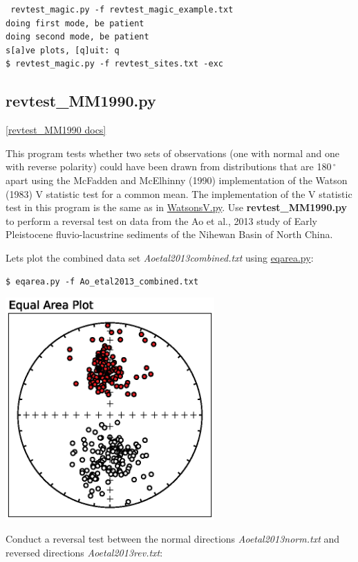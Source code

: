 \documentclass[11pt]{book}
\begin{document}
{{\begin{verbatim}
 revtest_magic.py -f revtest_magic_example.txt
doing first mode, be patient
doing second mode, be patient
s[a]ve plots, [q]uit: q
$ revtest_magic.py -f revtest_sites.txt -exc
\end{verbatim}

\subsection{revtest\_MM1990.py}
\href{https://github.com/PmagPy/PmagPy/blob/master/programs/revtest_MM1990.py}{[revtest\_MM1990 docs]}

This program tests whether two sets of observations (one with normal and one with reverse polarity) could have been drawn from distributions that are 180$\,^{\circ}$ apart using the McFadden and McElhinny (1990) implementation of the Watson (1983) V statistic test for a common mean. The implementation of the V statistic test in this program is the same as in \href{#WatsonsV.py}{WatsonsV.py}. Use \textbf{revtest\_MM1990.py} to perform a reversal test on data from the Ao et al., 2013 study of Early Pleistocene fluvio-lacustrine sediments of the Nihewan Basin of North China.

Lets plot the combined data set \textit{Ao\textunderscore etal2013\textunderscore combined.txt} using \href{#eqarea.py}{eqarea.py}:

\begin{verbatim}
$ eqarea.py -f Ao_etal2013_combined.txt
\end{verbatim}

\includegraphics[width=8cm]{EPSfiles/Ao2013eq.eps}}

Conduct a reversal test between the normal directions \textit{Ao\textunderscore etal2013\textunderscore norm.txt} and reversed directions \textit{Ao\textunderscore etal2013\textunderscore rev.txt}:

}
\end{document}
